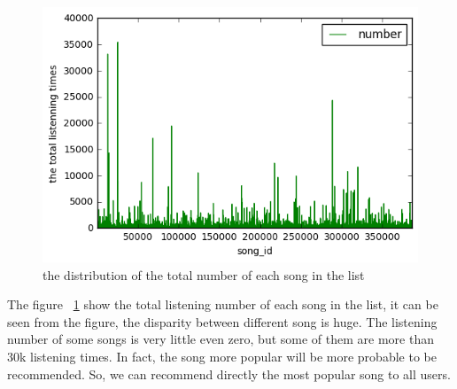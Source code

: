 \documentclass{article}
\begin{document}
\begin{figure}[ht]
\vskip 0.2in
\begin{center}
\centerline{\includegraphics[width=\columnwidth]{sum111}}
\caption{the distribution of the total number of each song in the list}
\label{fig:total number}
\end{center}
\vskip -0.2in
\end{figure} 
The figure ~\ref{fig:total number} show  the total listening number of each song in the list, it can be seen from the figure, the  disparity  between different song is huge.  The listening number of  some songs is very little even zero, but some of them are more than  30k listening times. In fact, the song more popular will be more probable to be recommended. So, we can recommend directly the most popular song to all users.
\end{document}
